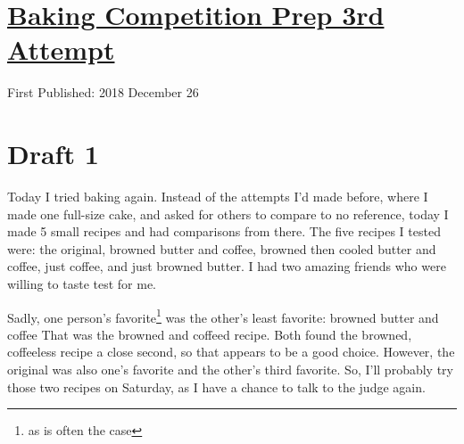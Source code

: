 \documentclass[12pt]{article}[titlepage]
\newcommand{\1}{\={a}}
\newcommand{\2}{\={e}}
\newcommand{\3}{\={\i}}
\newcommand{\4}{\=o}
\newcommand{\5}{\=u}
\newcommand{\6}{\={A}}
\renewcommand{\,}{\textsuperscript{,}}
\begin{document}
\doublespacing
\section{\href{baking-take-three.html}{Baking Competition Prep 3rd Attempt}}
First Published: 2018 December 26
\section{Draft 1}
Today I tried baking again.
Instead of the attempts I'd made before, where I made one full-size cake, and asked for others to compare to no reference, today I made 5 small recipes and had comparisons from there.
The five recipes I tested were: the original, browned butter and coffee, browned then cooled butter and coffee, just coffee, and just browned butter.
I had two amazing friends who were willing to taste test for me.

Sadly, one person's favorite\footnote{as is often the case} was the other's least favorite: browned butter and coffee
That was the browned and coffeed recipe.
Both found the browned, coffeeless recipe a close second, so that appears to be a good choice.
However, the original was also one's favorite and the other's third favorite.
So, I'll probably try those two recipes on Saturday, as I have a chance to talk to the judge again.
\end{document}
